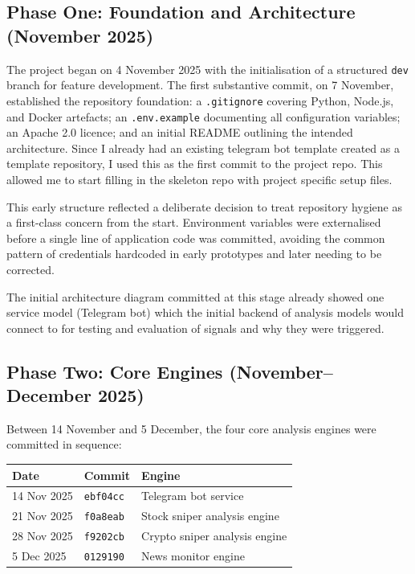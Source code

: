 \documentclass[12pt,a4paper]{article}
\begin{document}
\subsection{Phase One: Foundation and Architecture (November 2025)}

The project began on 4 November 2025 with the initialisation of a structured \texttt{dev} branch for feature development. The first substantive commit, on 7 November, established the repository foundation: a \texttt{.gitignore} covering Python, Node.js, and Docker artefacts; an \texttt{.env.example} documenting all configuration variables; an Apache 2.0 licence; and an initial README outlining the intended architecture. Since I already had an existing telegram bot template created as a template repository, I used this as the first commit to the project repo. This allowed me to start filling in the skeleton repo with project specific setup files.

This early structure reflected a deliberate decision to treat repository hygiene as a first-class concern from the start. Environment variables were externalised before a single line of application code was committed, avoiding the common pattern of credentials hardcoded in early prototypes and later needing to be corrected.

The initial architecture diagram committed at this stage already showed one service model (Telegram bot) which the initial backend of analysis models would connect to for testing and evaluation of signals and why they were triggered.

\subsection{Phase Two: Core Engines (November--December 2025)}

Between 14 November and 5 December, the four core analysis engines were committed in sequence:

\begin{center}
\begin{tabular}{@{}lll@{}}
\toprule
\textbf{Date} & \textbf{Commit} & \textbf{Engine} \\
\midrule
14 Nov 2025 & \texttt{ebf04cc} & Telegram bot service \\
21 Nov 2025 & \texttt{f0a8eab} & Stock sniper analysis engine \\
28 Nov 2025 & \texttt{f9202cb} & Crypto sniper analysis engine \\
5 Dec 2025  & \texttt{0129190} & News monitor engine \\
\bottomrule
\end{tabular}
\end{center}
\end{document}
